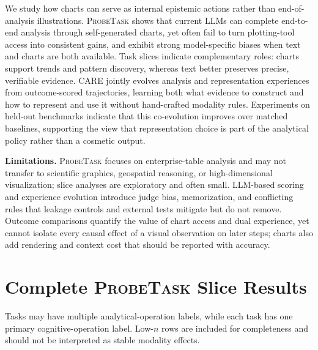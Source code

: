 \documentclass{article}
\newcommand{\method}{\textsc{CARE}}
\newcommand{\probe}{\textsc{ProbeTask}}
\begin{document}
We study how charts can serve as internal epistemic actions rather than end-of-analysis illustrations.
\probe{} shows that current LLMs can complete end-to-end analysis through self-generated charts, yet often fail to turn plotting-tool access into consistent gains, and exhibit strong model-specific biases when text and charts are both available.
Task slices indicate complementary roles: charts support trends and pattern discovery, whereas text better preserves precise, verifiable evidence.
\method{} jointly evolves analysis and representation experiences from outcome-scored trajectories, learning both what evidence to construct and how to represent and use it without hand-crafted modality rules.
Experiments on held-out benchmarks indicate that this co-evolution improves over matched baselines, supporting the view that representation choice is part of the analytical policy rather than a cosmetic output.

\textbf{Limitations.}
\probe{} focuses on enterprise-table analysis and may not transfer to scientific graphics, geospatial reasoning, or high-dimensional visualization; slice analyses are exploratory and often small.
LLM-based scoring and experience evolution introduce judge bias, memorization, and conflicting rules that leakage controls and external tests mitigate but do not remove.
Outcome comparisons quantify the value of chart access and dual experience, yet cannot isolate every causal effect of a visual observation on later steps; charts also add rendering and context cost that should be reported with accuracy.





\appendix

\section{Complete \probe{} Slice Results}
\label{app:slices}

Tasks may have multiple analytical-operation labels, while each task has one primary cognitive-operation label.
Low-$n$ rows are included for completeness and should not be interpreted as stable modality effects.
\end{document}

